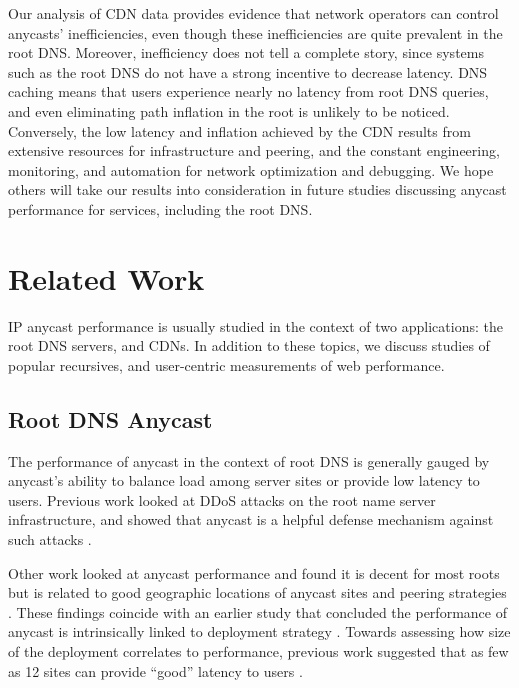 \documentclass[sigconf,letterpaper,nonacm,10pt,anonymous]{acmart}
\begin{document}
Our analysis of CDN data provides evidence that network operators can
control anycasts' inefficiencies, even though these inefficiencies are
quite prevalent in the root DNS. Moreover, inefficiency does not tell a
complete story, since systems such as the root DNS do not have a strong
incentive to decrease latency. DNS caching means that users experience
nearly no latency from root DNS queries, and even eliminating path
inflation in the root is unlikely to be noticed. Conversely, the low
latency and inflation achieved by the CDN results from extensive
resources for infrastructure and peering, and the constant engineering,
monitoring, and automation for network optimization and debugging. We
hope others will take our results into consideration in future studies
discussing anycast performance for services, including the root DNS.

\section{Related Work}\label{related-work-1}

\label{sec:related}

IP anycast performance is usually studied in the context of two
applications: the root DNS servers, and CDNs. In addition to these
topics, we discuss studies of popular recursives, and user-centric
measurements of web performance.

\subsection{Root DNS Anycast}\label{root-dns-anycast-2}

\label{sec:related_root_dns_anycast}

The performance of anycast in the context of root DNS is generally
gauged by anycast's ability to balance load among server sites or
provide low latency to users. Previous work looked at DDoS attacks on
the root name server infrastructure, and showed that anycast is a
helpful defense mechanism against such attacks
\cite{sarat2006use, moura2016anycast}.

Other work looked at anycast performance and found it is decent for most
roots \cite{sarat2006use} but is related to good geographic locations of
anycast sites and peering strategies \cite{de2017anycast}. These
findings coincide with an earlier study that concluded the performance
of anycast is intrinsically linked to deployment strategy
\cite{ballani2006measurement}. Towards assessing how size of the
deployment correlates to performance, previous work suggested that as
few as 12 sites can provide ``good'' latency to users
\cite{de2017anycast}.
\end{document}
